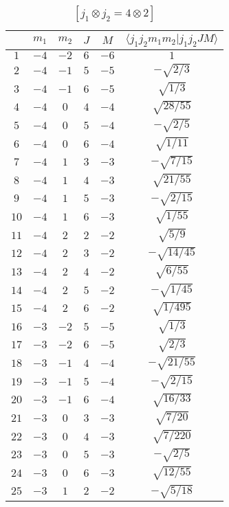 \begin{table}
\tiny
\caption{$[j_1 \otimes j_2 = 4 \otimes 2]$}
\begin{center}
\begin{tabular}{|c|c|c|c|c|c|}
\hline 
   & $m_1$ & $m_2$ & $J$ & $M$ & $\langle j_1 j_2 m_1 m_2 | j_1 j_2 J M \rangle$ \\ 
\hline 
$1$ & $-4$ & $-2$ & $6$ & $-6$ & $1$ \\ 
$2$ & $-4$ & $-1$ & $5$ & $-5$ & $-\sqrt{2/3}$ \\ 
$3$ & $-4$ & $-1$ & $6$ & $-5$ & $\sqrt{1/3}$ \\ 
$4$ & $-4$ & $0$ & $4$ & $-4$ & $\sqrt{28/55}$ \\ 
$5$ & $-4$ & $0$ & $5$ & $-4$ & $-\sqrt{2/5}$ \\ 
$6$ & $-4$ & $0$ & $6$ & $-4$ & $\sqrt{1/11}$ \\ 
$7$ & $-4$ & $1$ & $3$ & $-3$ & $-\sqrt{7/15}$ \\ 
$8$ & $-4$ & $1$ & $4$ & $-3$ & $\sqrt{21/55}$ \\ 
$9$ & $-4$ & $1$ & $5$ & $-3$ & $-\sqrt{2/15}$ \\ 
$10$ & $-4$ & $1$ & $6$ & $-3$ & $\sqrt{1/55}$ \\ 
$11$ & $-4$ & $2$ & $2$ & $-2$ & $\sqrt{5/9}$ \\ 
$12$ & $-4$ & $2$ & $3$ & $-2$ & $-\sqrt{14/45}$ \\ 
$13$ & $-4$ & $2$ & $4$ & $-2$ & $\sqrt{6/55}$ \\ 
$14$ & $-4$ & $2$ & $5$ & $-2$ & $-\sqrt{1/45}$ \\ 
$15$ & $-4$ & $2$ & $6$ & $-2$ & $\sqrt{1/495}$ \\ 
$16$ & $-3$ & $-2$ & $5$ & $-5$ & $\sqrt{1/3}$ \\ 
$17$ & $-3$ & $-2$ & $6$ & $-5$ & $\sqrt{2/3}$ \\ 
$18$ & $-3$ & $-1$ & $4$ & $-4$ & $-\sqrt{21/55}$ \\ 
$19$ & $-3$ & $-1$ & $5$ & $-4$ & $-\sqrt{2/15}$ \\ 
$20$ & $-3$ & $-1$ & $6$ & $-4$ & $\sqrt{16/33}$ \\ 
$21$ & $-3$ & $0$ & $3$ & $-3$ & $\sqrt{7/20}$ \\ 
$22$ & $-3$ & $0$ & $4$ & $-3$ & $\sqrt{7/220}$ \\ 
$23$ & $-3$ & $0$ & $5$ & $-3$ & $-\sqrt{2/5}$ \\ 
$24$ & $-3$ & $0$ & $6$ & $-3$ & $\sqrt{12/55}$ \\ 
$25$ & $-3$ & $1$ & $2$ & $-2$ & $-\sqrt{5/18}$ \\ 

\end{tabular}
\end{center}
\end{table}

